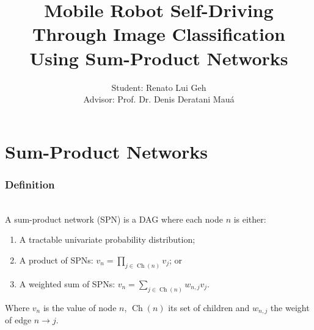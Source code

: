 \documentclass{beamer}
\title{Mobile Robot Self-Driving Through Image Classification Using Sum-Product Networks}
\date{}
\author{Student: Renato Lui Geh\\Advisor: Prof. Dr. Denis Deratani Mauá}
\institute{Institute of Mathematics and Statistics --- University of São Paulo}
\DeclareMathOperator*{\Ch}{\text{Ch}}
\begin{document}
\maketitle

\section{Sum-Product Networks}

\begin{frame}
  \frametitle{Definition}
  \begin{definition}~\\
    A sum-product network (SPN) is a DAG where each node $n$ is either:
    \begin{enumerate}
      \item A tractable univariate probability distribution;
      \item A product of SPNs: $v_n=\prod_{j\in\Ch(n)}v_j$; or
      \item A weighted sum of SPNs: $v_n=\sum_{j\in\Ch(n)}w_{n,j}v_j$.
    \end{enumerate}
    Where $v_n$ is the value of node $n$, $\Ch(n)$ its set of children and $w_{n,j}$ the weight of
    edge $n\to j$.
  \end{definition}
\end{frame}
\end{document}
